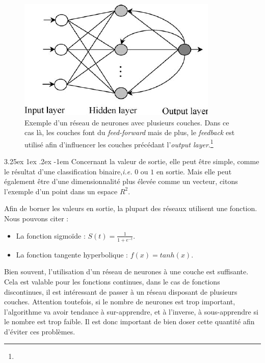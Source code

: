 \documentclass[a4paper, 11pt]{article}
\makeatletter
\renewcommand\paragraph{\@startsection{paragraph}{5}{\z@}%
  {3.25ex \@plus1ex \@minus.2ex}%
  {-1em}%
  {\normalfont\normalsize\bfseries}}
\makeatother
\begin{document}
\begin{figure}[H]
\centering
\includegraphics{images/neural_net_feedback}
\caption[]{Exemple d'un réseau de neurones avec plusieurs couches. Dans ce cas là,
les couches font du \textit{feed-forward} mais de plus, le \textit{feedback} est utilisé afin
d'influencer les couches précédant l'\textit{output layer}.\footnote[2]{}}
\end{figure}


\paragraph{}
Concernant la valeur de sortie, elle peut être simple, comme le résultat d'une classification binaire,\textit{i.e.} $0$ ou $1$
en sortie. Mais elle peut également être d'une dimensionnalité plus élevée comme un vecteur, citons l'exemple d'un point
dans un espace $R^2$.

Afin de borner les valeurs en sortie, la plupart des réseaux utilisent une fonction. Nous pouvons citer :
\begin{itemize}
\item La fonction sigmoïde : $S(t) = \frac{1}{1 + e^{-t}}$.
\item La fonction tangente hyperbolique : $f(x) = tanh(x)$.
\end{itemize}

Bien souvent, l'utilisation d'un réseau de neurones à une couche est suffisante. Cela est valable pour les fonctions continues,
dans le cas de fonctions discontinues, il est intéressant de passer à un réseau disposant de plusieurs couches.
Attention toutefois, si le nombre de neurones est trop important, l'algorithme va avoir tendance à sur-apprendre,
et à l'inverse, à sous-apprendre si le nombre est trop faible. Il est donc important de bien doser cette quantité afin
d'éviter ces problèmes.
\end{document}
